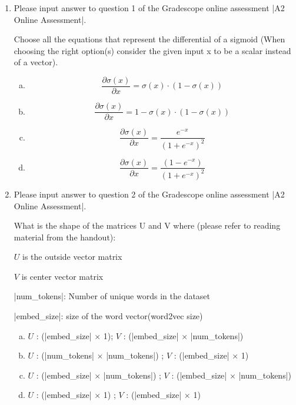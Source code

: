 \begin{enumerate}[1.]
\item {}
Please input answer to question 1 of the Gradescope online assessment |A2 Online Assessment|.

Choose all the equations that represent the differential of a sigmoid (When choosing the right option(s) consider the given input x to be a scalar instead of a vector).
\begin{enumerate}[(a)]
\item \begin{equation*}\frac{\partial \sigma(x)}{\partial x} = {\sigma(x) \cdot (1-\sigma(x))}\end{equation*}
\item \begin{equation*}\frac{\partial \sigma(x)}{\partial x} = 1 - {\sigma(x) \cdot (1-\sigma(x))}\end{equation*}
\item \begin{equation*}\frac{\partial \sigma(x)}{\partial x} = \frac{e^{-x}}{(1+e^{-x})^2}\end{equation*}
\item \begin{equation*}\frac{\partial \sigma(x)}{\partial x} = \frac{ (1-e^{-x})}{(1+e^{-x})^2}\end{equation*}
\end{enumerate}

\item {}
Please input answer to question 2 of the Gradescope online assessment |A2 Online Assessment|.

What is the shape of the matrices U and V where (please refer to reading material from the handout):

$U$ is the outside vector matrix

$V$ is center vector matrix

|num_tokens|: Number of unique words in the dataset

|embed_size|: size of the word vector(word2vec size)

\begin{enumerate}[(a)]
\item $U$ : (|embed_size| $\times$ 1); $V$ : (|embed_size| $\times$ |num_tokens|)
\item $U$ : (|num_tokens| $\times$ |num_tokens|) ; $V$ : (|embed_size| $\times$ 1)
\item $U$ : (|embed_size| $\times$ |num_tokens|) ; $V$ : (|embed_size| $\times$ |num_tokens|) 
\item $U$ : (|embed_size| $\times$ 1) ; $V$ : (|embed_size| $\times$ 1) 
\end{enumerate}


\end{enumerate}
